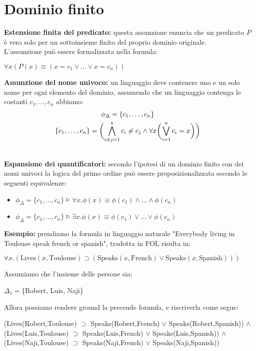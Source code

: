 \documentclass[../main.tex]{subfiles}
\begin{document}
   \section{Dominio finito}
   \textbf{Estensione finita del predicato:} questa assunzione enuncia che un predicato $P$ è vero solo per un sottoinsieme finito del proprio dominio originale.\\
   L'assunzione può essere formalizzata nella formula:
   \begin{center}
      $\forall x(P(x) \equiv (x=c_1 \lor \dots \lor x=c_n))$
   \end{center}
   \textbf{Assunzione del nome univoco:} un linguaggio deve contenere uno e un solo nome per ogni elemento del dominio, assumendo che un linguaggio contenga le costanti $c_1, \dots , c_n$ abbiamo:
   \begin{gather*}
      \phi_\Delta = \{ c_1, \dots , c_n \}\\
      \vspace{4ex}
      \{ c_1, \dots , c_n \} = \biggl( \bigwedge_{i \neq j=1}^{n}{c_i \neq c_j} \land \forall x \biggl( \bigvee_{i=1}^{n}{c_i=x} \biggr) \biggr)
   \end{gather*}
   \textbf{Espansione dei quantificatori:} secondo l'ipotesi di un dominio finito con dei nomi univoci la logica del primo ordine può essere proposizionalizzata secondo le seguenti equivalenze:
   \begin{itemize}
      \item $\phi_\Delta = \{ c_1, \dots , c_n \} \models \forall x.\phi(x) \equiv \phi(c_1) \land \dots \land \phi(c_n)$
      \item $\phi_\Delta = \{ c_1, \dots , c_n \} \models \exists x.\phi(x) \equiv \phi(c_1) \lor \dots \lor \phi(c_n)$
   \end{itemize}
   \textbf{Esempio:} prendiamo la formula in linguaggio naturale "Everybody living in Toulouse speak french or spanish", tradotta in FOL risulta in:
   \begin{center}
      $\forall x.( \text{Lives}( x,\text{Toulouse} ) \supset ( \text{Speaks}( x,\text{French} ) \lor \text{Speaks}( x,\text{Spanish} ) ) )$
   \end{center}
   Assumiamo che l'insieme delle persone sia:
   \begin{center}
      $\Delta_1=$\{Robert, Luis, Naji\}
   \end{center}
   Allora possiamo rendere ground la precende formula, e riscriverla come segue:
   \begin{center}
      (Lives(Robert,Toulouse) $\supset$ Speaks(Robert,French) $\lor$ Speaks(Robert,Spanish)) $\land$\\
      (Lives(Luis,Toulouse) $\supset$ Speaks(Luis,French) $\lor$ Speaks(Luis,Spanish)) $\land$\\
      (Lives(Naji,Toulouse) $\supset$ Speaks(Naji,French) $\lor$ Speaks(Naji,Spanish)) 
   \end{center}
\end{document}
